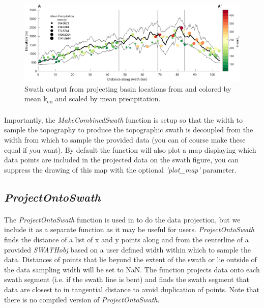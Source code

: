 \begin{figure}[H]
	\centering
	\includegraphics[width=16.5cm]{PNGs/SanGabes_KsnSwath.png}
	\caption{Swath output from  projecting basin locations from  and colored by mean k\textsubscript{sn} and scaled by mean precipitation.}
	\label{fig:KsnSwath}
\end{figure}

\paragraph{}Importantly, the \textit{MakeCombinedSwath} function is setup so that the width to sample the topography to produce the topographic swath is decoupled from the width from which to sample the provided data (you can of course make these equal if you want). By default the function will also plot a map displaying which data points are included in the projected data on the swath figure, you can suppress the drawing of this map with the optional \textit{'plot\_map'} parameter.

\subsection{\textit{ProjectOntoSwath}}
\paragraph{}The \textit{ProjectOntoSwath} function is used in  to do the data projection, but we include it as a separate function as it may be useful for users. \textit{ProjectOntoSwath} finds the distance of a list of x and y points along and from the centerline of a provided \textit{SWATHobj} based on a user defined width within which to sample the data. Distances of points that lie beyond the extent of the swath or lie outside of the data sampling width will be set to NaN. The function projects data onto each swath segment (i.e. if the swath line is bent) and finds the swath segment that data are closest to in tangential distance to avoid duplication of points. Note that there is no compiled version of \textit{ProjectOntoSwath}.

